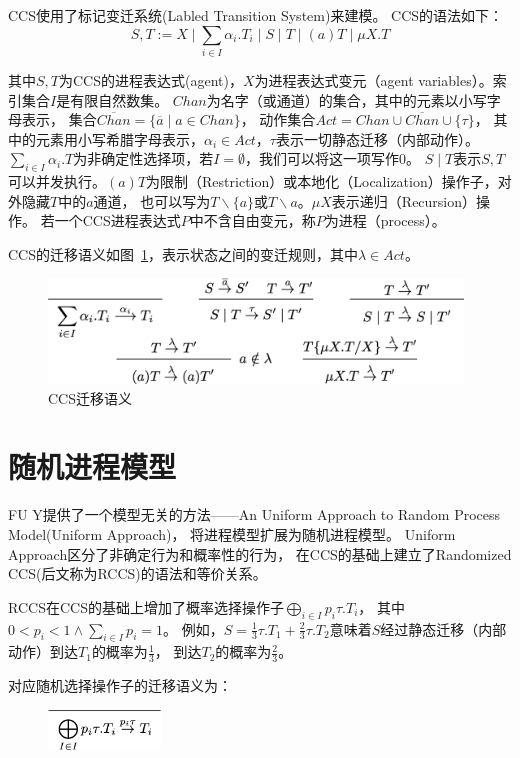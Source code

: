    CCS使用了标记变迁系统(Labled Transition System)来建模。
   CCS的语法如下：
   $$S,T:=X\mid \sum_{i\in I}\alpha_i.T_i\mid S\mid T \mid (a)T \mid \mu X.T$$

   其中$S,T$为CCS的进程表达式(agent)，$X$为进程表达式变元（agent variables）。索引集合$I$是有限自然数集。
   $Chan$为名字（或通道）的集合，其中的元素以小写字母表示，
   集合$\overline{Chan}=\{\overline{a}\mid a\in Chan\}$，
   动作集合$Act=Chan\cup \overline{Chan}\cup \{\tau\} $，
   其中的元素用小写希腊字母表示，$\alpha_i\in Act$，$\tau$表示一切静态迁移（内部动作）。
   $\sum_{i\in I}\alpha_i.T$为非确定性选择项，若$I=\emptyset$，我们可以将这一项写作$0$。
   $S\mid T$表示$S,T$可以并发执行。$(a)T$为限制（Restriction）或本地化（Localization）操作子，对外隐藏$T$中的$a$通道，
   也可以写为$T\backslash \{a\}$或$T\backslash a$。$\mu X$表示递归（Recursion）操作。
   若一个CCS进程表达式$P$中不含自由变元，称$P$为进程（process）。

   CCS的迁移语义如图~\ref{fig_ccs}，表示状态之间的变迁规则，其中$\lambda \in Act$。

   \begin{figure}[!htbp]
    \small
    \centering
    \includegraphics[width=11cm]{../figures/ccs.png}
    \caption[]{CCS迁移语义}
     \label{fig_ccs}
 \end{figure}

   \section{随机进程模型}

   FU Y提供了一个模型无关的方法——An Uniform Approach to Random Process Model(Uniform Approach)\cite{Fu_UniformApproach}，
   将进程模型扩展为随机进程模型。
   Uniform Approach区分了非确定行为和概率性的行为，
   在CCS的基础上建立了Randomized CCS(后文称为RCCS)的语法和等价关系。

   RCCS在CCS的基础上增加了概率选择操作子$\bigoplus_{i\in I}p_i\tau.T_i$，
   其中$0<p_i<1 \wedge \sum_{i\in I}p_i = 1$。
   例如，$S=\frac{1}{3}\tau.T_1+\frac{2}{3}\tau.T_2$意味着$S$经过静态迁移（内部动作）到达$T_1$的概率为$\frac{1}{3}$，
   到达$T_2$的概率为$\frac{2}{3}$。

   对应随机选择操作子的迁移语义为：
   \begin{figure}[!htbp]
    \small
    \centering
    \includegraphics[width=3cm]{../figures/rccs.png}
     \label{fig_rccs}
 \end{figure}

